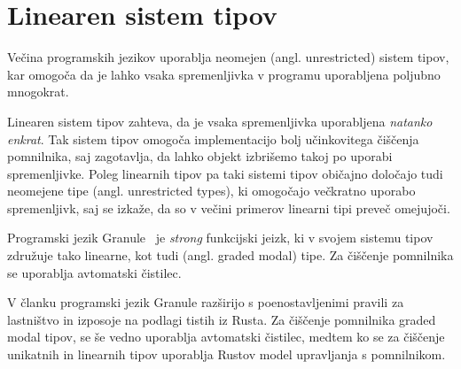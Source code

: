 \section{Linearen sistem tipov}

Večina programskih jezikov uporablja neomejen (angl. unrestricted) sistem tipov, kar omogoča da je lahko vsaka spremenljivka v programu uporabljena poljubno mnogokrat.

Linearen sistem tipov zahteva, da je vsaka spremenljivka uporabljena \textit{natanko enkrat}. Tak sistem tipov omogoča implementacijo bolj učinkovitega čiščenja pomnilnika, saj zagotavlja, da lahko objekt izbrišemo takoj po uporabi spremenljivke. Poleg linearnih tipov pa taki sistemi tipov običajno določajo tudi neomejene tipe (angl. unrestricted types), ki omogočajo večkratno uporabo spremenljivk, saj se izkaže, da so v večini primerov linearni tipi preveč omejujoči.

Programski jezik Granule~\cite{orchard2019quantitative} je \textit{strong} funkcijski jeizk, ki v svojem sistemu tipov združuje tako linearne, kot tudi (angl. graded modal) tipe. 
Za čiščenje pomnilnika se uporablja avtomatski čistilec.

V članku \cite{10.1145/3649848} programski jezik Granule razširijo s poenostavljenimi pravili za lastništvo in izposoje na podlagi tistih iz Rusta. Za čiščenje pomnilnika graded modal tipov, se še vedno uporablja avtomatski čistilec, medtem ko se za čiščenje unikatnih in linearnih tipov uporablja Rustov model upravljanja s pomnilnikom.

